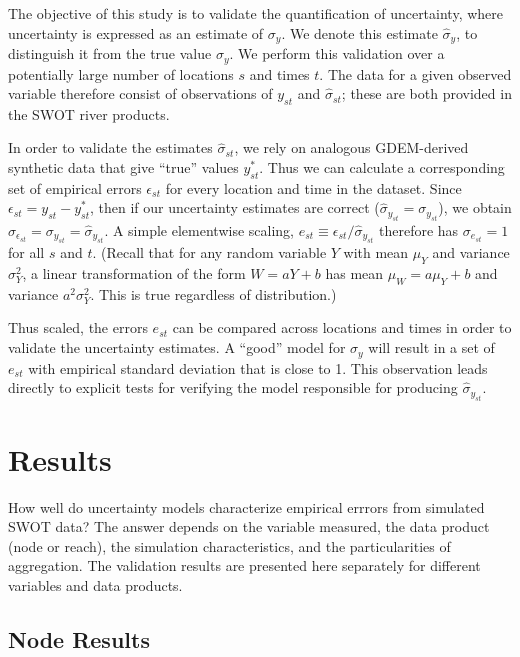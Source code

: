 \documentclass[]{book}
\begin{document}
The objective of this study is to validate the quantification of uncertainty, where uncertainty is expressed as an estimate of \(\sigma_y\). We denote this estimate \(\hat{\sigma}_y\), to distinguish it from the true value \(\sigma_y\). We perform this validation over a potentially large number of locations \(s\) and times \(t\). The data for a given observed variable therefore consist of observations of \(y_{st}\) and \(\hat{\sigma}_{st}\); these are both provided in the SWOT river products.

In order to validate the estimates \(\hat{\sigma}_{st}\), we rely on analogous GDEM-derived synthetic data that give ``true'' values \(y^*_{st}\). Thus we can calculate a corresponding set of empirical errors \(\epsilon_{st}\) for every location and time in the dataset. Since \(\epsilon_{st} = y_{st} - y^*_{st}\), then if our uncertainty estimates are correct (\(\hat{\sigma}_{y_{st}} = \sigma_{y_{st}}\)), we obtain \(\sigma_{\epsilon_{st}} = \sigma_{y_{st}}= \hat{\sigma}_{y_{st}}\). A simple elementwise scaling, \(e_{st} \equiv \epsilon_{st} / \hat{\sigma}_{y_{st}}\) therefore has \(\sigma_{e_{st}} = 1\) for all \(s\) and \(t\). (Recall that for any random variable \(Y\) with mean \(\mu_Y\) and variance \(\sigma^2_Y\), a linear transformation of the form \(W = aY + b\) has mean \(\mu_W = a\mu_Y + b\) and variance \(a^2\sigma_Y^2\). This is true regardless of distribution.)

Thus scaled, the errors \(e_{st}\) can be compared across locations and times in order to validate the uncertainty estimates. A ``good'' model for \(\sigma_y\) will result in a set of \(e_{st}\) with empirical standard deviation that is close to 1. This observation leads directly to explicit tests for verifying the model responsible for producing \(\hat{\sigma}_{y_{st}}\).

\hypertarget{results}{%
\chapter{Results}\label{results}}

How well do uncertainty models characterize empirical errrors from simulated SWOT data? The answer depends on the variable measured, the data product (node or reach), the simulation characteristics, and the particularities of aggregation. The validation results are presented here separately for different variables and data products.

\hypertarget{node-results}{%
\section{Node Results}\label{node-results}}
\end{document}
